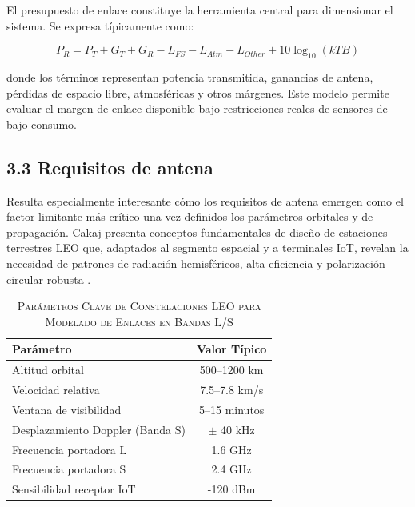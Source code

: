 El presupuesto de enlace constituye la herramienta central para dimensionar el sistema. Se expresa típicamente como:

\begin{equation}
P_{R} = P_{T} + G_{T} + G_{R} - L_{FS} - L_{Atm} - L_{Other} + 10\log_{10}(kTB)
\label{eq:link_budget}
\end{equation}

donde los términos representan potencia transmitida, ganancias de antena, pérdidas de espacio libre, atmosféricas y otros márgenes. Este modelo permite evaluar el margen de enlace disponible bajo restricciones reales de sensores de bajo consumo.

\subsection{3.3 Requisitos de antena}

Resulta especialmente interesante cómo los requisitos de antena emergen como el factor limitante más crítico una vez definidos los parámetros orbitales y de propagación. Cakaj presenta conceptos fundamentales de diseño de estaciones terrestres LEO que, adaptados al segmento espacial y a terminales IoT, revelan la necesidad de patrones de radiación hemisféricos, alta eficiencia y polarización circular robusta \cite{Cakaj2023}.

\begin{table}[htbp]
\renewcommand{\arraystretch}{1.3} %
\centering
\caption{\textsc{Parámetros Clave de Constelaciones LEO para Modelado de Enlaces en Bandas L/S}}
\label{tab:parametros_leo_bandas_ls}
\begin{tabularx}{\columnwidth}{|X|c|}
\hline
\textbf{Parámetro} & \textbf{Valor Típico} \\ \hline
Altitud orbital & 500–1200 km \\ \hline
Velocidad relativa & 7.5–7.8 km/s \\ \hline
Ventana de visibilidad & 5–15 minutos \\ \hline
Desplazamiento Doppler (Banda S) & $\pm$ 40 kHz \\ \hline
Frecuencia portadora L & 1.6 GHz \\ \hline
Frecuencia portadora S & 2.4 GHz \\ \hline
Sensibilidad receptor IoT & -120 dBm \\ \hline
\end{tabularx}
\end{table}

